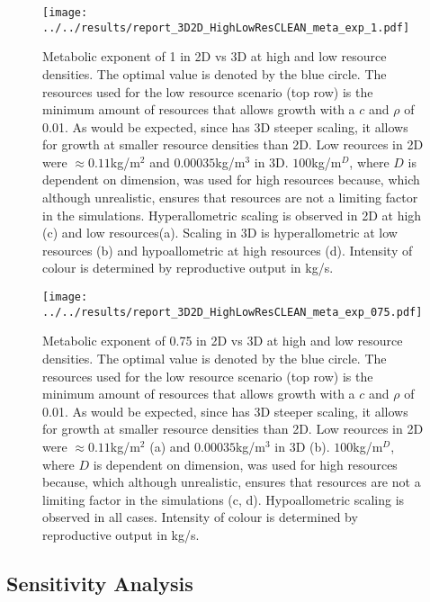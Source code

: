 \documentclass[a4paper, 11pt, hidelinks]{article} %
\begin{document}
		\begin{figure}[H]
		\centering
		\texttt{[image: ../../results/report\_3D2D\_HighLowResCLEAN\_meta\_exp\_1.pdf]}
		
		\caption{Metabolic exponent of 1 in 2D vs 3D at high and low resource densities. The optimal value is denoted by the blue circle.
			The resources used for the low resource scenario (top row) is the minimum amount of resources that allows growth with a $c$ and $\rho$ of 0.01.  As would be expected, since has 3D steeper scaling, it allows for growth at smaller resource densities than 2D.
			Low reources in 2D were $ \approx 0.11$kg/m$^2 $ and $ 0.00035$kg/m$^3 $ in 3D.
			$ 100$kg/m$^D $, where $D$ is dependent on dimension, was used for high resources because, which although unrealistic, ensures that resources are not a limiting factor in the simulations.
			Hyperallometric scaling is observed in 2D at high (c) and low resources(a).
			Scaling in 3D is hyperallometric at low resources (b) and hypoallometric at high resources (d).
			Intensity of colour is determined by reproductive output in kg/s.}
		\label{resources2D3D_meta_exp1}
	\end{figure}
	\begin{figure}[H]
		
		
		\centering
		\texttt{[image: ../../results/report\_3D2D\_HighLowResCLEAN\_meta\_exp\_075.pdf]}
		
		\caption{Metabolic exponent of 0.75 in 2D vs 3D at high and low resource densities. The optimal value is denoted by the blue circle.
			The resources used for the low resource scenario (top row) is the minimum amount of resources that allows growth with a $c$ and $\rho$ of 0.01.  As would be expected, since has 3D steeper scaling, it allows for growth at smaller resource densities than 2D.
			Low reources in 2D were $ \approx 0.11$kg/m$^2 $ (a) and $ 0.00035$kg/m$^3 $ in 3D (b).
			$ 100$kg/m$^D $, where $D$ is dependent on dimension, was used for high resources because, which although unrealistic, ensures that resources are not a limiting factor in the simulations (c, d).
			Hypoallometric scaling is observed in all cases.
			Intensity of colour is determined by reproductive output in kg/s.}
		\label{resources2D3D_meta_exp0.75}
	\end{figure}
	
	\subsection{Sensitivity Analysis}
\end{document}
